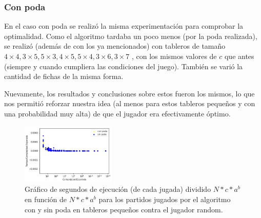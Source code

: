 \documentclass[A4paper,oneside,fleqn,11pt]{article}
\theoremstyle{definition}
\begin{document}
\subsubsection{Con poda}
En el caso con poda se realizó la misma experimentación para comprobar la optimalidad. Como el algoritmo tardaba un poco menos (por la poda realizada), se realizó (además de con los ya mencionados) con tableros de tamaño $4\times4, 3\times5, 5\times3, 4\times5, 5\times4, 3\times6, 3\times7$ , con los mismos valores de $c$ que antes (siempre y cuando cumpliera las condiciones del juego). También se varió la cantidad de fichas de la misma forma.

Nuevamente, los resultados y conclusiones sobre estos fueron los mismos, lo que nos permitió reforzar nuestra idea (al menos para estos tableros pequeños y con una probabilidad muy alta) de que el jugador era efectivamente óptimo.



\begin{figure}
	\includegraphics[width=0.4\textwidth]{complejidad1.png}
	\caption{ Gráfico de segundos de ejecución (de cada jugada) dividido $N*c*a^b$ en función de $N*c*a^b$ para los partidos jugados por el algoritmo con y sin poda en tableros pequeños contra el jugador random.}
\end{figure}
\end{document}
